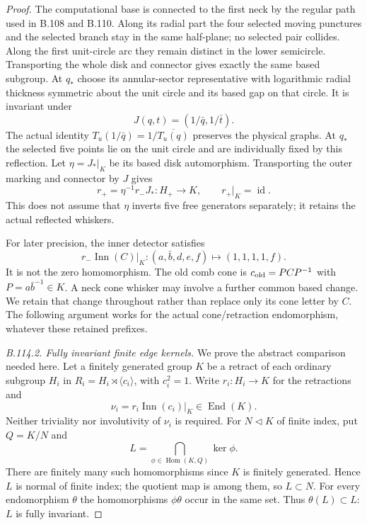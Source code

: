 \begin{proof}
The computational base is connected to the first neck by the
regular path used in B.108 and B.110. Along its radial part the
four selected moving punctures and the selected branch stay in
the same half-plane; no selected pair collides. Along the first
unit-circle arc they remain distinct in the lower semicircle.
Transporting the whole disk and connector gives exactly the same
based subgroup. At $q_*$ choose its annular-sector representative
with logarithmic radial thickness symmetric about the unit circle
and its based gap on that circle. It is invariant under
\[
 J(q,t)=(1/\bar q,1/\bar t).
\]
The actual identity $T_u(1/\bar q)=1/\overline{T_u(q)}$ preserves
the physical graphs. At $q_*$ the selected five points lie on
the unit circle and are individually fixed by this reflection.
Let $\eta=J_*|_K$ be its based disk automorphism. Transporting the
outer marking and connector by $J$ gives
\[
 r_+=\eta^{-1}r_-J_*:H_+\longrightarrow K,
 \qquad r_+|_K=\operatorname{id}.
\]
This does not assume that $\eta$ inverts five free generators
separately; it retains the actual reflected whiskers.

For later precision, the inner detector satisfies
\begin{equation}\label{eq:B114-nonzero-nu}
 r_-\operatorname{Inn}(C)|_K:
 (a,\bar b,d,e,f)\longmapsto(1,1,1,1,f).
\end{equation}
It is not the zero homomorphism. The old comb cone is
$c_{\rm old}=P C P^{-1}$ with $P=a\bar b^{-1}\in K$.
A neck cone whisker may involve a further common based change.
We retain that change throughout rather than replace only its
cone letter by $C$. The following argument works for the actual
cone/retraction endomorphism, whatever these retained prefixes.

\emph{B.114.2. Fully invariant finite edge kernels.}
We prove the abstract comparison needed here. Let a finitely
generated group $K$ be a retract of each ordinary subgroup
$H_i$ in $R_i=H_i\rtimes\langle c_i\rangle$, with $c_i^2=1$.
Write $r_i:H_i\to K$ for the retractions and
\[
 \nu_i=r_i\operatorname{Inn}(c_i)|_K\in\operatorname{End}(K).
\]
Neither triviality nor involutivity of $\nu_i$ is required.
For $N\triangleleft K$ of finite index, put $Q=K/N$ and
\begin{equation}\label{eq:B114-fully-invariant}
 L=\bigcap_{\phi\in\operatorname{Hom}(K,Q)}\ker\phi.
\end{equation}
There are finitely many such homomorphisms since $K$ is finitely
generated. Hence $L$ is normal of finite index; the quotient map
is among them, so $L\subset N$. For every endomorphism $\theta$
the homomorphisms $\phi\theta$ occur in the same set. Thus
$\theta(L)\subset L$: $L$ is fully invariant.


\end{proof}
